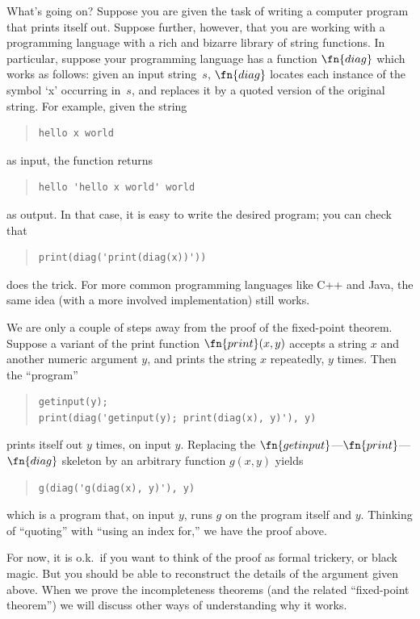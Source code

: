 \documentclass[10pt,a4paper]{article}
\theoremstyle{plain}
\theoremstyle{definition}
\theoremstyle{remark}
\newenvironment{explain}{}{}
\begin{document}
\begin{explain}
What's going on? Suppose you are given the task of writing a computer
program that prints itself out. Suppose further, however, that you are
working with a programming language with a rich and bizarre library of
string functions. In particular, suppose your programming language has
a function $\fn{diag}$ which works as follows: given an input
string~$s$, $\fn{diag}$ locates each instance of the symbol `x'
occurring in~$s$, and replaces it by a quoted version of the original
string. For example, given the string
\begin{quote}
\begin{verbatim}
hello x world
\end{verbatim}
\end{quote}
as input, the function returns
\begin{quote}
\begin{verbatim}
hello 'hello x world' world
\end{verbatim}
\end{quote}
as output. In that case, it is easy to write the desired program; you
can check that
\begin{quote}
\begin{verbatim}
print(diag('print(diag(x))'))
\end{verbatim}
\end{quote}
does the trick. For more common programming languages like C++ and
Java, the same idea (with a more involved implementation) still works.

We are only a couple of steps away from the proof of the fixed-point
theorem. Suppose a variant of the print function $\fn{print}(x,y)$
accepts a string $x$ and another numeric argument $y$, and prints the
string $x$ repeatedly, $y$ times. Then the ``program''
\begin{quote}
\begin{verbatim}
getinput(y);
print(diag('getinput(y); print(diag(x), y)'), y)
\end{verbatim}
\end{quote}
prints itself out $y$ times, on input $y$. Replacing the
$\fn{getinput}$---$\fn{print}$---$\fn{diag}$ skeleton by an
arbitrary function $g(x,y)$ yields
\begin{quote}
\begin{verbatim}
g(diag('g(diag(x), y)'), y)
\end{verbatim}
\end{quote}
which is a program that, on input $y$, runs $g$ on the program itself
and $y$. Thinking of ``quoting'' with ``using an index for,'' we have
the proof above.

For now, it is o.k.\ if you want to think of the proof as formal
trickery, or black magic. But you should be able to reconstruct the
details of the argument given above. When we prove the incompleteness
theorems (and the related ``fixed-point theorem'') we will discuss
other ways of understanding why it works.
\end{explain}
\end{document}
